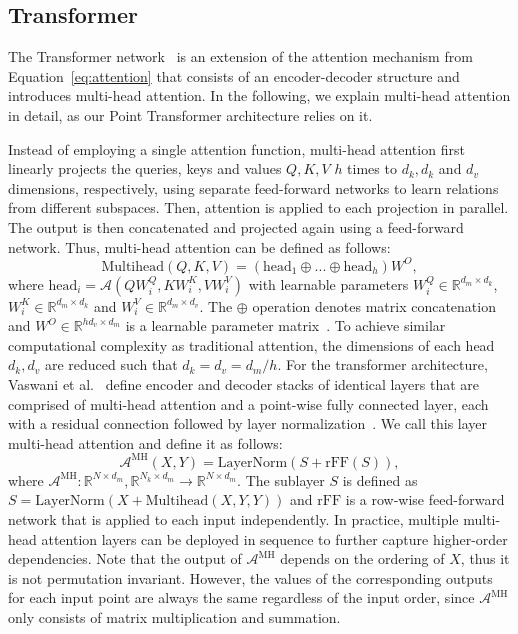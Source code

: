 \documentclass{ieeeaccess}
\begin{document}
\subsection{Transformer}\label{seq:transformer}
The Transformer network~\cite{vaswani2017attention} is an extension of the attention mechanism from Equation~\eqref{eq:attention} that consists of an encoder-decoder structure and introduces multi-head attention. In the following, we explain multi-head attention in detail, as our Point Transformer architecture relies on it.

Instead of employing a single attention function, multi-head attention first linearly projects the queries, keys and values $Q,K,V$ $h$ times to $d_k, d_k$ and $d_v$ dimensions, respectively, using separate feed-forward networks to learn relations from different subspaces. Then, attention is applied to each projection in parallel. The output is then concatenated and projected again using a feed-forward network. Thus, multi-head attention can be defined as follows:
\begin{equation}
    \text{Multihead}(Q,K,V) = (\text{head}_1 \oplus ... \oplus \text{head}_h) W^O,
\end{equation}
where \mbox{$\text{head}_i = \mathcal{A}(QW^Q_i, KW^ K_i, VW^V_i)$} with learnable parameters \mbox{$W^Q_i \in \mathbb{R}^{d_m \times d_k}$, $W^K_i \in \mathbb{R}^{d_m \times d_k}$} and \mbox{$W^V_i \in \mathbb{R}^{d_m \times d_v}$.}
The $\oplus$ operation denotes matrix concatenation and $W^O \in \mathbb{R}^{hd_v \times d_m}$ is a learnable parameter matrix~\cite{vaswani2017attention}. To achieve similar computational complexity as traditional attention, the dimensions of each head $d_k, d_v$ are reduced such that $d_k = d_v = d_m/h$. 
For the transformer architecture, Vaswani et al.~\cite{vaswani2017attention} define encoder and decoder stacks of identical layers that are comprised of multi-head attention and a point-wise fully connected layer, each with a residual connection followed by layer normalization~\cite{ba2016layer}. We call this layer multi-head attention and define it as follows:
\begin{equation}\label{eq:mal}
    \mathcal{A}^{\text{MH}} (X,Y) = \text{LayerNorm}(S + \text{rFF}(S)),
\end{equation}
where $\mathcal{A}^{\text{MH}} : \mathbb{R}^{N\times d_m},\mathbb{R}^{N_k \times d_m} \rightarrow  \mathbb{R}^{N\times d_m}$. 
The sublayer $S$ is defined as $S = \text{LayerNorm}(X + \text{Multihead}(X,Y,Y))$ and $\text{rFF}$ is a row-wise feed-forward network that is applied to each input independently. In practice, multiple multi-head attention layers can be deployed in sequence to further capture higher-order dependencies. Note that the output of $\mathcal{A}^{\text{MH}}$ depends on the ordering of $X$, thus it is not permutation invariant. However, the values of the corresponding outputs for each input point are always the same regardless of the input order, since $\mathcal{A}^{\text{MH}}$ only consists of matrix multiplication and summation.
\end{document}
